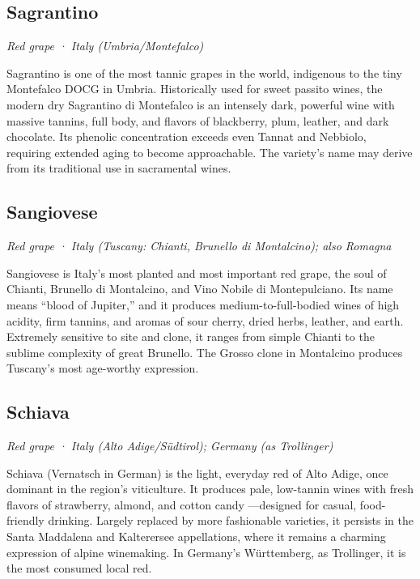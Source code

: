 \subsection*{Sagrantino}
\textit{Red grape · Italy (Umbria/Montefalco)}\par\smallskip

Sagrantino is one of the most tannic grapes in the world, indigenous to the tiny Montefalco DOCG in Umbria. Historically used for sweet passito wines, the modern dry Sagrantino di Montefalco is an intensely dark, powerful wine with massive tannins, full body, and flavors of blackberry, plum, leather, and dark chocolate. Its phenolic concentration exceeds even Tannat and Nebbiolo, requiring extended aging to become approachable. The variety’s name may derive from its traditional use in sacramental wines.

\subsection*{Sangiovese}
\textit{Red grape · Italy (Tuscany: Chianti, Brunello di Montalcino); also Romagna}\par\smallskip

Sangiovese is Italy’s most planted and most important red grape, the soul of Chianti, Brunello di Montalcino, and Vino Nobile di Montepulciano. Its name means “blood of Jupiter,” and it produces medium-to-full-bodied wines of high acidity, firm tannins, and aromas of sour cherry, dried herbs, leather, and earth. Extremely sensitive to site and clone, it ranges from simple Chianti to the sublime complexity of great Brunello. The Grosso clone in Montalcino produces Tuscany’s most age-worthy expression.

\subsection*{Schiava}
\textit{Red grape · Italy (Alto Adige/Südtirol); Germany (as Trollinger)}\par\smallskip

Schiava (Vernatsch in German) is the light, everyday red of Alto Adige, once dominant in the region’s viticulture. It produces pale, low-tannin wines with fresh flavors of strawberry, almond, and cotton candy —designed for casual, food-friendly drinking. Largely replaced by more fashionable varieties, it persists in the Santa Maddalena and Kalterersee appellations, where it remains a charming expression of alpine winemaking. In Germany’s Württemberg, as Trollinger, it is the most consumed local red.


